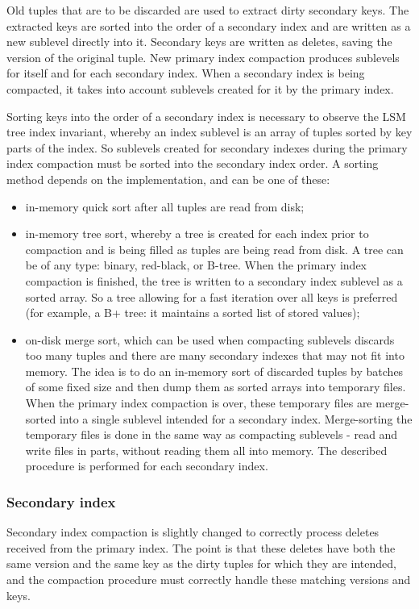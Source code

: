 \documentclass{vldb}
\begin{document}
Old tuples that are to be discarded are used to extract dirty secondary keys.
The extracted keys are sorted into the order of a secondary index and are written as
a new sublevel directly into it. Secondary keys are written as deletes, saving the
version of the original tuple. New primary index compaction produces sublevels for
itself and for each secondary index. When a secondary index is being compacted, it takes
into account sublevels created for it by the primary index.

Sorting keys into the order of a secondary index is necessary to observe the LSM tree
index invariant, whereby an index sublevel is an array of tuples sorted by key
parts of the index. So sublevels created for secondary indexes during the primary
index compaction must be sorted into the secondary index order. A sorting method
depends on the implementation, and can be one of these:
\begin{itemize}
\item in-memory quick sort after all tuples are read from disk;
\item in-memory tree sort, whereby a tree is created for each index prior to
compaction and is being filled as tuples are being read from disk. A tree can be of
any type: binary, red-black, or B-tree. When the primary index compaction is finished, the
tree is written to a secondary index sublevel as a sorted array. So a tree allowing for a fast
iteration over all keys is preferred (for example, a B+ tree: it maintains a sorted list
of stored values);
\item on-disk merge sort, which can be used when compacting sublevels discards too
many tuples and there are many secondary indexes that may not fit into memory.
The idea is to do an in-memory sort of discarded tuples by batches of some fixed
size and then dump them as sorted arrays into temporary files. When the primary index
compaction is over, these temporary files are merge-sorted into a single sublevel
intended for a secondary index. Merge-sorting the temporary files is done in the same
way as compacting sublevels - read and write files in parts, without reading them all
into memory. The described procedure is performed for each secondary index.
\end{itemize}

\subsubsection{Secondary index}

Secondary index compaction is slightly changed to correctly process deletes received
from the primary index. The point is that these deletes have both the same version and
the same key as the dirty tuples for which they are intended, and the compaction
procedure must correctly handle these matching versions and keys.
\end{document}
